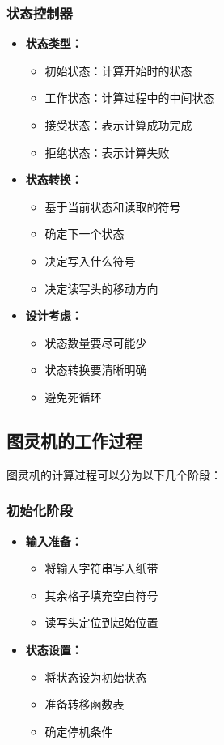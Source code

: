 \documentclass[a4paper,12pt]{ctexart}
\begin{document}
\subsubsection{状态控制器}
\begin{itemize}
    \item \textbf{状态类型：}
        \begin{itemize}
            \item 初始状态：计算开始时的状态
            \item 工作状态：计算过程中的中间状态
            \item 接受状态：表示计算成功完成
            \item 拒绝状态：表示计算失败
        \end{itemize}
    \item \textbf{状态转换：}
        \begin{itemize}
            \item 基于当前状态和读取的符号
            \item 确定下一个状态
            \item 决定写入什么符号
            \item 决定读写头的移动方向
        \end{itemize}
    \item \textbf{设计考虑：}
        \begin{itemize}
            \item 状态数量要尽可能少
            \item 状态转换要清晰明确
            \item 避免死循环
        \end{itemize}
\end{itemize}

\subsection{图灵机的工作过程}
图灵机的计算过程可以分为以下几个阶段：

\subsubsection{初始化阶段}
\begin{itemize}
    \item \textbf{输入准备：}
        \begin{itemize}
            \item 将输入字符串写入纸带
            \item 其余格子填充空白符号
            \item 读写头定位到起始位置
        \end{itemize}
    \item \textbf{状态设置：}
        \begin{itemize}
            \item 将状态设为初始状态
            \item 准备转移函数表
            \item 确定停机条件
        \end{itemize}
\end{itemize}
\end{document}
